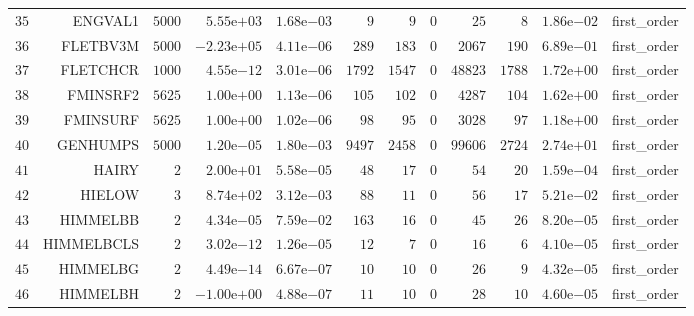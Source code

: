 \begin{longtable}{rrrrrrrrrrrr}
  \(    35\) & ENGVAL1 & \(  5000\) & \( 5.55\)e\(+03\) & \( 1.68\)e\(-03\) & \(     9\) & \(     9\) & \(     0\) & \(    25\) & \(     8\) & \( 1.86\)e\(-02\) & first\_order \\
  \(    36\) & FLETBV3M & \(  5000\) & \(-2.23\)e\(+05\) & \( 4.11\)e\(-06\) & \(   289\) & \(   183\) & \(     0\) & \(  2067\) & \(   190\) & \( 6.89\)e\(-01\) & first\_order \\
  \(    37\) & FLETCHCR & \(  1000\) & \( 4.55\)e\(-12\) & \( 3.01\)e\(-06\) & \(  1792\) & \(  1547\) & \(     0\) & \( 48823\) & \(  1788\) & \( 1.72\)e\(+00\) & first\_order \\
  \(    38\) & FMINSRF2 & \(  5625\) & \( 1.00\)e\(+00\) & \( 1.13\)e\(-06\) & \(   105\) & \(   102\) & \(     0\) & \(  4287\) & \(   104\) & \( 1.62\)e\(+00\) & first\_order \\
  \(    39\) & FMINSURF & \(  5625\) & \( 1.00\)e\(+00\) & \( 1.02\)e\(-06\) & \(    98\) & \(    95\) & \(     0\) & \(  3028\) & \(    97\) & \( 1.18\)e\(+00\) & first\_order \\
  \(    40\) & GENHUMPS & \(  5000\) & \( 1.20\)e\(-05\) & \( 1.80\)e\(-03\) & \(  9497\) & \(  2458\) & \(     0\) & \( 99606\) & \(  2724\) & \( 2.74\)e\(+01\) & first\_order \\
  \(    41\) & HAIRY & \(     2\) & \( 2.00\)e\(+01\) & \( 5.58\)e\(-05\) & \(    48\) & \(    17\) & \(     0\) & \(    54\) & \(    20\) & \( 1.59\)e\(-04\) & first\_order \\
  \(    42\) & HIELOW & \(     3\) & \( 8.74\)e\(+02\) & \( 3.12\)e\(-03\) & \(    88\) & \(    11\) & \(     0\) & \(    56\) & \(    17\) & \( 5.21\)e\(-02\) & first\_order \\
  \(    43\) & HIMMELBB & \(     2\) & \( 4.34\)e\(-05\) & \( 7.59\)e\(-02\) & \(   163\) & \(    16\) & \(     0\) & \(    45\) & \(    26\) & \( 8.20\)e\(-05\) & first\_order \\
  \(    44\) & HIMMELBCLS & \(     2\) & \( 3.02\)e\(-12\) & \( 1.26\)e\(-05\) & \(    12\) & \(     7\) & \(     0\) & \(    16\) & \(     6\) & \( 4.10\)e\(-05\) & first\_order \\
  \(    45\) & HIMMELBG & \(     2\) & \( 4.49\)e\(-14\) & \( 6.67\)e\(-07\) & \(    10\) & \(    10\) & \(     0\) & \(    26\) & \(     9\) & \( 4.32\)e\(-05\) & first\_order \\
  \(    46\) & HIMMELBH & \(     2\) & \(-1.00\)e\(+00\) & \( 4.88\)e\(-07\) & \(    11\) & \(    10\) & \(     0\) & \(    28\) & \(    10\) & \( 4.60\)e\(-05\) & first\_order \\

\end{longtable}
